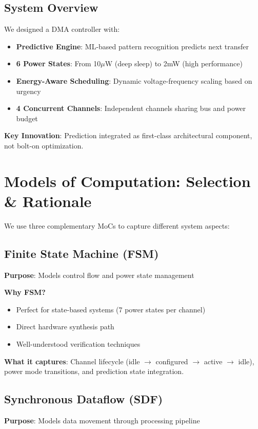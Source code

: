 \documentclass[conference]{IEEEtran}
\begin{document}
\subsection{System Overview}
We designed a DMA controller with:
\begin{itemize}
    \item \textbf{Predictive Engine}: ML-based pattern recognition predicts next transfer
    \item \textbf{6 Power States}: From 10$\mu$W (deep sleep) to 2mW (high performance)
    \item \textbf{Energy-Aware Scheduling}: Dynamic voltage-frequency scaling based on urgency
    \item \textbf{4 Concurrent Channels}: Independent channels sharing bus and power budget
\end{itemize}

\textbf{Key Innovation}: Prediction integrated as first-class architectural component, not bolt-on optimization.

\section{Models of Computation: Selection \& Rationale}

We use three complementary MoCs to capture different system aspects:

\subsection{Finite State Machine (FSM)}
\textbf{Purpose}: Models control flow and power state management

\textbf{Why FSM?}
\begin{itemize}
    \item Perfect for state-based systems (7 power states per channel)
    \item Direct hardware synthesis path
    \item Well-understood verification techniques
\end{itemize}

\textbf{What it captures}: Channel lifecycle (idle $\rightarrow$ configured $\rightarrow$ active $\rightarrow$ idle), power mode transitions, and prediction state integration.

\subsection{Synchronous Dataflow (SDF)}
\textbf{Purpose}: Models data movement through processing pipeline
\end{document}
